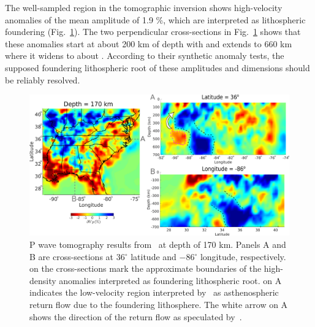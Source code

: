 \documentclass[draft,linenumbers]{agujournal2018}
\begin{document}
    The well-sampled region in the tomographic inversion shows
    high-velocity anomalies of the mean amplitude of 1.9 \%, which are interpreted as lithospheric foundering (Fig.~\ref{fig_tomo}). The two perpendicular cross-sections in Fig.~\ref{fig_tomo} shows that these anomalies start at about 200 km of depth with  and extends to 660 km where it widens to about . According to their synthetic anomaly tests, the supposed foundering lithospheric root of these amplitudes and dimensions should be reliably resolved.
%
\begin{figure}[ht]
    \centering
    \includegraphics[width=\linewidth]{figures/figure_tomography.png}
    \caption{P wave tomography results from~\citep{Biryol_2016} at depth of 170 km. Panels A and B are cross-sections at 36$^\circ$ latitude and $-$86$^{\circ}$ longitude, respectively.  on the cross-sections mark the approximate boundaries of the high-density anomalies interpreted as foundering lithospheric root.  on A indicates the low-velocity region interpreted by~\citet{Biryol_2016} as asthenospheric return flow due to the foundering lithosphere. The white arrow on A shows the direction of the return flow as speculated by~\citet{Biryol_2016}.}
    \label{fig_tomo}
 \end{figure}
\end{document}
